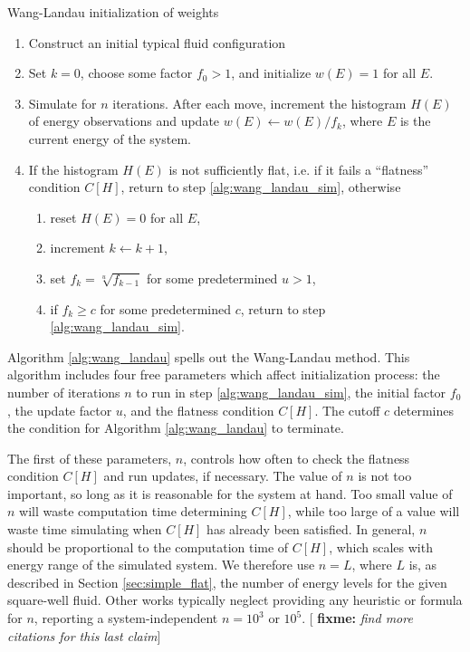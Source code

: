 \documentclass[11pt]{article}
\newcommand{\p}[1]{\left(#1\right)} %
\renewcommand{\sp}[1]{\left[#1\right]} %
\newenvironment{alg}
{\hrulefill\begin{enumerate}}
{\end{enumerate}\hrulefill}
\newcommand{\red}[1]{{\bf \color{red} #1}}
\newcommand{\fixme}[1]{[\red{fixme:} \emph{#1}]}
\begin{document}
\begin{algorithm}[tb]
  \caption{Wang-Landau initialization of weights}
  \label{alg:wang_landau}
  \begin{alg}

  \item Construct an initial typical fluid configuration

  \item Set $k=0$, choose some factor $f_0>1$, and initialize
    $w\p{E}=1$ for all $E$.

  \item Simulate for $n$ iterations. After each move, increment the
    histogram $H\p{E}$ of energy observations and update
    $w\p{E}\leftarrow w\p{E}/f_k$, where $E$ is the current energy of
    the system.
    \label{alg:wang_landau_sim}

  \item If the histogram $H\p{E}$ is not sufficiently flat, i.e. if it
    fails a ``flatness'' condition $C\sp{H}$, return to step
    \ref{alg:wang_landau_sim}, otherwise
    \begin{enumerate}
    \item reset $H\p{E}=0$ for all $E$,
    \item increment $k\leftarrow k+1$,
    \item set $f_k=\sqrt[u]{f_{k-1}}$ for some predetermined $u>1$,
      \label{alg:wang_landau_update}
    \item if $f_k\ge c$ for some predetermined $c$, return to step
      \ref{alg:wang_landau_sim}.
      \label{alg:wang_landau_end}
    \end{enumerate}

  \end{alg}
\end{algorithm}

Algorithm \ref{alg:wang_landau} spells out the Wang-Landau
method. This algorithm includes four free parameters which affect
initialization process: the number of iterations $n$ to run in step
\ref{alg:wang_landau_sim}, the initial factor $f_0$, the update factor
$u$, and the flatness condition $C\sp{H}$. The cutoff $c$ determines
the condition for Algorithm \ref{alg:wang_landau} to terminate.

The first of these parameters, $n$, controls how often to check the
flatness condition $C\sp{H}$ and run updates, if necessary. The value
of $n$ is not too important, so long as it is reasonable for the
system at hand. Too small value of $n$ will waste computation time
determining $C\sp{H}$, while too large of a value will waste time
simulating when $C\sp{H}$ has already been satisfied. In general, $n$
should be proportional to the computation time of $C\sp{H}$, which
scales with energy range of the simulated system. We therefore use
$n=L$, where $L$ is, as described in Section \ref{sec:simple_flat},
the number of energy levels for the given square-well fluid. Other
works typically neglect providing any heuristic or formula for $n$,
reporting a system-independent $n=10^3$\cite{wang_landau_mod} or
$10^5$\cite{wang_landau}.  \fixme{find more citations for this last
  claim}
\end{document}
